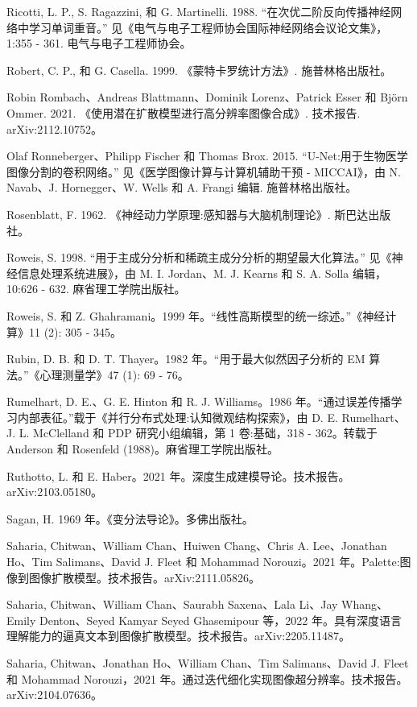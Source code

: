 \documentclass[10pt]{report}
\begin{document}
Ricotti, L. P., S. Ragazzini, 和 G. Martinelli. 1988. “在次优二阶反向传播神经网络中学习单词重音。” 见《电气与电子工程师协会国际神经网络会议论文集》，1:355 - 361. 电气与电子工程师协会。

Robert, C. P., 和 G. Casella. 1999. 《蒙特卡罗统计方法》. 施普林格出版社。

Robin Rombach、Andreas Blattmann、Dominik Lorenz、Patrick Esser 和 Björn Ommer. 2021. 《使用潜在扩散模型进行高分辨率图像合成》. 技术报告. arXiv:2112.10752。

Olaf Ronneberger、Philipp Fischer 和 Thomas Brox. 2015. “U-Net:用于生物医学图像分割的卷积网络。” 见《医学图像计算与计算机辅助干预 - MICCAI》，由 N. Navab、J. Hornegger、W. Wells 和 A. Frangi 编辑. 施普林格出版社。

Rosenblatt, F. 1962. 《神经动力学原理:感知器与大脑机制理论》. 斯巴达出版社。

Roweis, S. 1998. “用于主成分分析和稀疏主成分分析的期望最大化算法。” 见《神经信息处理系统进展》，由 M. I. Jordan、M. J. Kearns 和 S. A. Solla 编辑，10:626 - 632. 麻省理工学院出版社。

Roweis, S. 和 Z. Ghahramani。1999 年。“线性高斯模型的统一综述。”《神经计算》11 (2): 305 - 345。

Rubin, D. B. 和 D. T. Thayer。1982 年。“用于最大似然因子分析的 EM 算法。”《心理测量学》47 (1): 69 - 76。

Rumelhart, D. E.、G. E. Hinton 和 R. J. Williams。1986 年。“通过误差传播学习内部表征。”载于《并行分布式处理:认知微观结构探索》，由 D. E. Rumelhart、J. L. McClelland 和 PDP 研究小组编辑，第 1 卷:基础，318 - 362。转载于 Anderson 和 Rosenfeld (1988)。麻省理工学院出版社。

Ruthotto, L. 和 E. Haber。2021 年。深度生成建模导论。技术报告。arXiv:2103.05180。

Sagan, H. 1969 年。《变分法导论》。多佛出版社。

Saharia, Chitwan、William Chan、Huiwen Chang、Chris A. Lee、Jonathan Ho、Tim Salimans、David J. Fleet 和 Mohammad Norouzi。2021 年。Palette:图像到图像扩散模型。技术报告。arXiv:2111.05826。

Saharia, Chitwan、William Chan、Saurabh Saxena、Lala Li、Jay Whang、Emily Denton、Seyed Kamyar Seyed Ghasemipour 等，2022 年。具有深度语言理解能力的逼真文本到图像扩散模型。技术报告。arXiv:2205.11487。

Saharia, Chitwan、Jonathan Ho、William Chan、Tim Salimans、David J. Fleet 和 Mohammad Norouzi，2021 年。通过迭代细化实现图像超分辨率。技术报告。arXiv:2104.07636。
\end{document}
